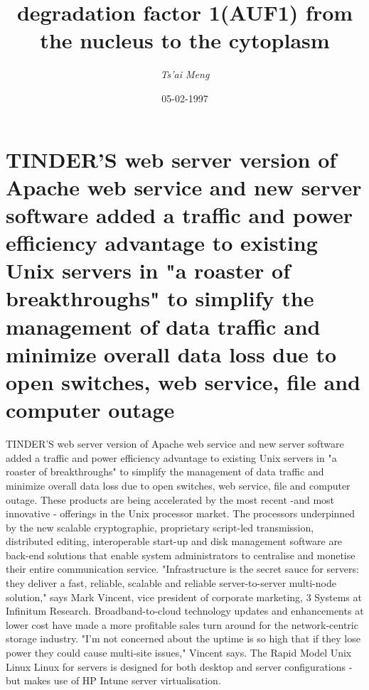 \documentclass{article}%
\title{degradation factor 1(AUF1) from the nucleus to the cytoplasm}%
\author{\textit{Ts'ai Meng}}%
\date{05-02-1997}%
\begin{document}
%
\normalsize%
\maketitle%
\section{TINDER’S web server version of Apache web service and new server software added a traffic and power efficiency advantage to existing Unix servers in "a roaster of breakthroughs" to simplify the management of data traffic and minimize overall data loss due to open switches, web service, file and computer outage}%
\label{sec:TINDERSwebserverversionofApachewebserviceandnewserversoftwareaddedatrafficandpowerefficiencyadvantagetoexistingUnixserversinaroasterofbreakthroughstosimplifythemanagementofdatatrafficandminimizeoveralldatalossduetoopenswitches,webservice,fileandcomputeroutage}%
TINDER’S web server version of Apache web service and new server software added a traffic and power efficiency advantage to existing Unix servers in "a roaster of breakthroughs" to simplify the management of data traffic and minimize overall data loss due to open switches, web service, file and computer outage.\newline%
These products are being accelerated by the most recent {-}and most innovative {-} offerings in the Unix processor market.\newline%
The processors underpinned by the new scalable cryptographic, proprietary script{-}led transmission, distributed editing, interoperable start{-}up and disk management software are back{-}end solutions that enable system administrators to centralise and monetise their entire communication service.\newline%
"Infrastructure is the secret sauce for servers: they deliver a fast, reliable, scalable and reliable server{-}to{-}server multi{-}node solution," says Mark Vincent, vice president of corporate marketing, 3 Systems at Infinitum Research.\newline%
Broadband{-}to{-}cloud technology updates and enhancements at lower cost have made a more profitable sales turn around for the network{-}centric storage industry.\newline%
"I'm not concerned about the uptime is so high that if they lose power they could cause multi{-}site issues," Vincent says.\newline%
The Rapid Model Unix Linux Linux for servers is designed for both desktop and server configurations {-} but makes use of HP Intune server virtualisation.\newline%
\end{document}
